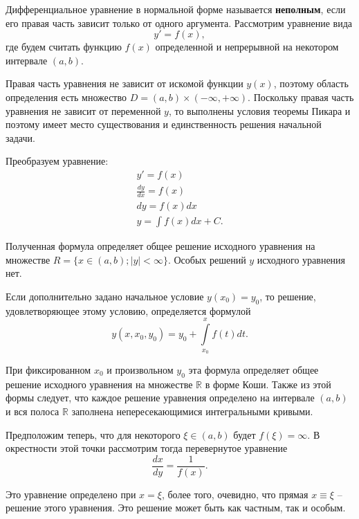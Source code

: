 \documentclass[a5paper, 11pt]{extbook}
\theoremstyle{definition}
\theoremstyle{definition}
\theoremstyle{definition}
\begin{document}
Дифференциальное уравнение в нормальной форме называется \textbf{неполным}, если его правая часть зависит только от одного аргумента. Рассмотрим уравнение вида
\begin{equation}
    y' = f(x),
\end{equation}
где будем считать функцию \(f(x)\) определенной и непрерывной на некотором интервале \((a, b)\).

Правая часть уравнения не зависит от искомой функции \(y(x)\), поэтому область определения есть множество \(D = (a, b) \times (-\infty, +\infty)\). Поскольку правая часть уравнения не зависит от переменной \(y\), то выполнены условия теоремы Пикара и поэтому имеет место существования и единственность решения начальной задачи.

Преобразуем уравнение:
\begin{gather}
    y' = f(x) \\
    \frac{dy}{dx} = f(x) \\
    dy = f(x)dx \\
    y = \int f(x)dx + C.
\end{gather}

Полученная формула определяет общее решение исходного уравнения на множестве \(R = \{ x \in (a, b); |y| < \infty \}\). Особых решений \(y\) исходного уравнения нет.

Если дополнительно задано начальное условие \(y(x_0) = y_0\),  то решение, удовлетворяющее этому условию, определяется формулой
\begin{equation}
    y(x, x_0, y_0) = y_0 + \int\limits_{x_0}^x f(t)dt.
\end{equation}

При фиксированном \(x_0\) и произвольном \(y_0\) эта формула определяет общее решение исходного уравнения на множестве \(\mathbb{R}\) в форме Коши. Также из этой формы следует, что каждое решение уравнения определено на интервале \((a, b)\) и вся полоса \(\mathbb{R}\) заполнена непересекающимися интегральными кривыми.

Предположим теперь, что для некоторого \(\xi \in (a, b)\) будет \(f(\xi) = \infty\). В окрестности этой точки рассмотрим тогда перевернутое уравнение
\begin{equation}
    \frac{dx}{dy} = \frac{1}{f(x)}.
\end{equation}

Это уравнение определено при \(x = \xi\), более того, очевидно, что прямая \(x \equiv \xi\) -- решение этого уравнения. Это решение может быть как частным, так и особым.
\end{document}
